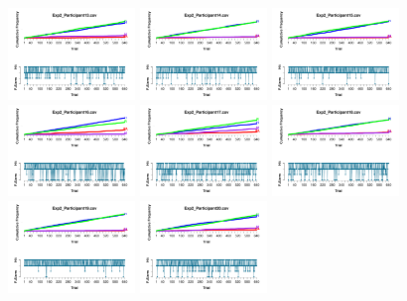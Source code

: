 \begin{figure}[th]
\includegraphics[width=0.30\textwidth]{Figures/Outcome_Exp2_P13} \includegraphics[width=0.30\textwidth]{Figures/Outcome_Exp2_P14} \includegraphics[width=0.30\textwidth]{Figures/Outcome_Exp2_P15}
\includegraphics[width=0.30\textwidth]{Figures/Outcome_Exp2_P16} \includegraphics[width=0.30\textwidth]{Figures/Outcome_Exp2_P17} \includegraphics[width=0.30\textwidth]{Figures/Outcome_Exp2_P18}
\includegraphics[width=0.30\textwidth]{Figures/Outcome_Exp2_P19} \includegraphics[width=0.30\textwidth]{Figures/Outcome_Exp2_P20} 

\end{figure}
